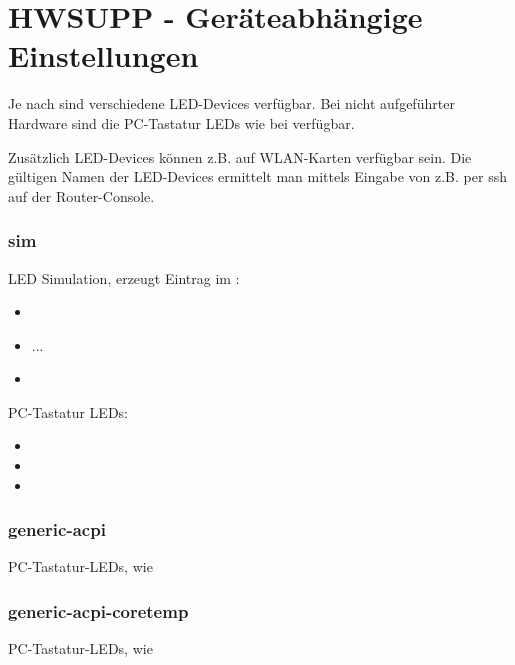 
\section{HWSUPP - Geräteabhängige Einstellungen}

  Je nach  sind verschiedene LED-Devices verfügbar.
  Bei nicht aufgeführter Hardware sind die PC-Tastatur LEDs wie bei  
   verfügbar.

  Zusätzlich LED-Devices können z.B. auf WLAN-Karten verfügbar sein.
  Die gültigen Namen der LED-Devices ermittelt man mittels Eingabe von
   z.B. per ssh auf der Router-Console.
 

\subsubsection{sim}
LED Simulation, erzeugt Eintrag im :
\begin{itemize}
  \item {}
  \item ...
  \item {}
\end{itemize}

PC-Tastatur LEDs:
\begin{itemize}
  \item {}
  \item {}
  \item {}
\end{itemize}

\subsubsection{generic-acpi}
PC-Tastatur-LEDs, wie 

\subsubsection{generic-acpi-coretemp}
PC-Tastatur-LEDs, wie 

